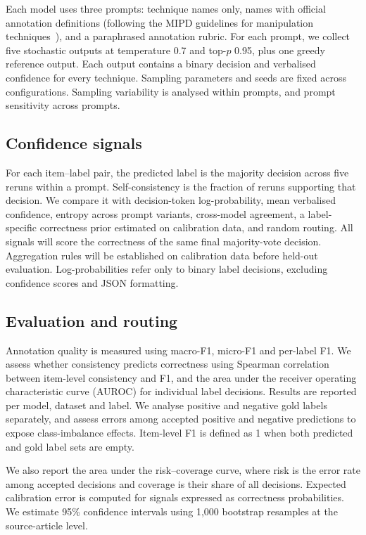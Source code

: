 \documentclass[11pt]{article}
\begin{document}
Each model uses three prompts: technique names only, names with
official annotation definitions (following the MIPD guidelines
for manipulation techniques~\cite{mipd-2024}), and a paraphrased
annotation rubric.
For each prompt, we collect five stochastic outputs at temperature
0.7 and top-$p$ 0.95, plus one greedy reference output.
Each output contains a binary decision and verbalised confidence
for every technique. Sampling parameters and seeds are fixed
across configurations. Sampling variability is analysed within
prompts, and prompt sensitivity across prompts.

\subsection{Confidence signals}

For each item--label pair, the predicted label is the majority
decision across five reruns within a prompt. Self-consistency
is the fraction of reruns supporting that decision.
We compare it with decision-token log-probability, mean verbalised
confidence, entropy across prompt variants, cross-model agreement,
a label-specific correctness prior estimated on calibration data,
and random routing. All signals will score the correctness of the same final majority-vote decision. Aggregation rules will be established
on calibration data before held-out evaluation.
Log-probabilities refer only to binary label decisions,
excluding confidence scores and JSON formatting.

\subsection{Evaluation and routing}

Annotation quality is measured using macro-F1, micro-F1 and per-label
F1. We assess whether consistency predicts correctness using
Spearman correlation between item-level consistency and F1,
and the area under the receiver operating characteristic curve
(AUROC) for individual label decisions. Results are reported per model, dataset and label. We analyse positive and negative gold labels separately, and assess errors among accepted positive and negative predictions to expose class-imbalance effects.
Item-level F1 is defined as 1 when both predicted and gold label
sets are empty.

We also report the area under the risk--coverage curve, where risk
is the error rate among accepted decisions and coverage is their
share of all decisions. Expected calibration error is computed
for signals expressed as correctness probabilities.
We estimate 95\% confidence intervals using 1,000 bootstrap
resamples at the source-article level.
\end{document}
